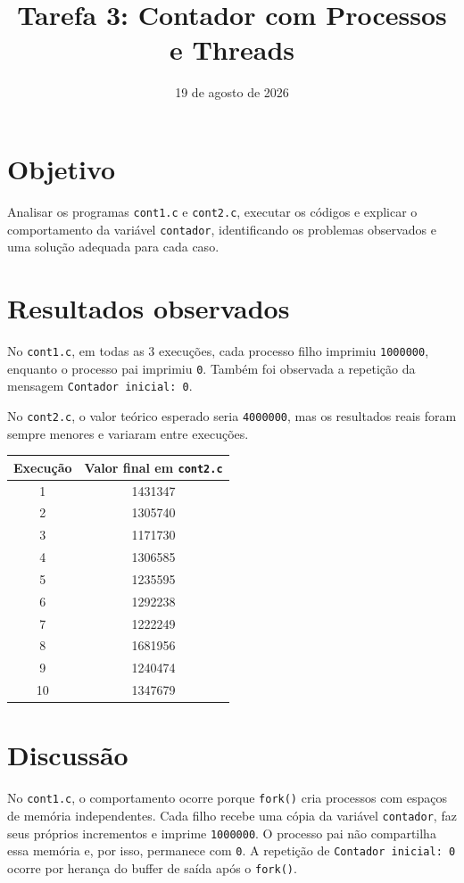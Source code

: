 \documentclass[12pt,a4paper]{article}
\title{Tarefa 3: Contador com Processos e Threads}
\author{}
\date{19 de agosto de 2026}
\begin{document}
\maketitle

\section*{Objetivo}

Analisar os programas \texttt{cont1.c} e \texttt{cont2.c}, executar os c\'odigos e explicar o comportamento da vari\'avel \texttt{contador}, identificando os problemas observados e uma solu\c{c}\~ao adequada para cada caso.

\section*{Resultados observados}

No \texttt{cont1.c}, em todas as 3 execu\c{c}\~oes, cada processo filho imprimiu \texttt{1000000}, enquanto o processo pai imprimiu \texttt{0}. Tamb\'em foi observada a repeti\c{c}\~ao da mensagem \texttt{Contador inicial: 0}.

No \texttt{cont2.c}, o valor te\'orico esperado seria \texttt{4000000}, mas os resultados reais foram sempre menores e variaram entre execu\c{c}\~oes.

\begin{center}
\begin{tabular}{cc}
\toprule
Execu\c{c}\~ao & Valor final em \texttt{cont2.c} \\
\midrule
1  & 1431347 \\
2  & 1305740 \\
3  & 1171730 \\
4  & 1306585 \\
5  & 1235595 \\
6  & 1292238 \\
7  & 1222249 \\
8  & 1681956 \\
9  & 1240474 \\
10 & 1347679 \\
\bottomrule
\end{tabular}
\end{center}

\section*{Discuss\~ao}

No \texttt{cont1.c}, o comportamento ocorre porque \texttt{fork()} cria processos com espa\c{c}os de mem\'oria independentes. Cada filho recebe uma c\'opia da vari\'avel \texttt{contador}, faz seus pr\'oprios incrementos e imprime \texttt{1000000}. O processo pai n\~ao compartilha essa mem\'oria e, por isso, permanece com \texttt{0}. A repeti\c{c}\~ao de \texttt{Contador inicial: 0} ocorre por heran\c{c}a do buffer de sa\'ida ap\'os o \texttt{fork()}.
\end{document}
